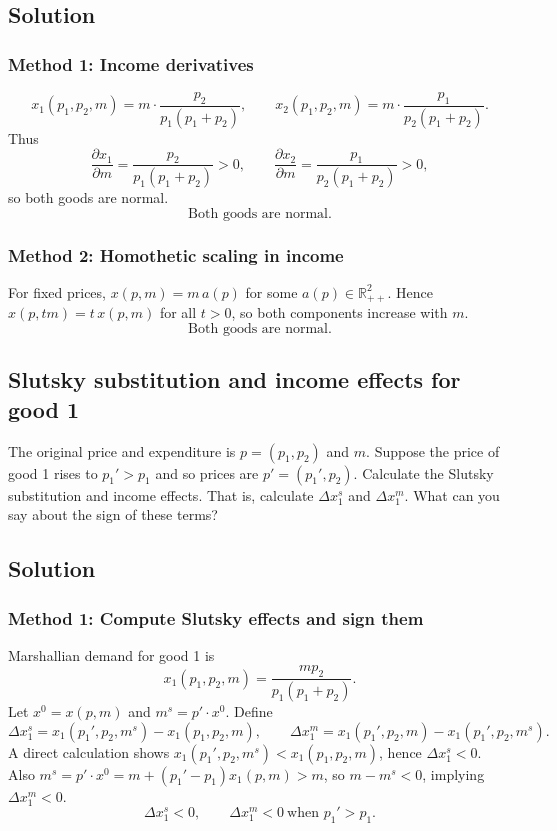 \documentclass[12pt]{article}
\newcommand{\R}{\mathbb{R}}
\newcommand{\dotp}{\cdot}
\begin{document}
\subsection*{Solution}
\subsubsection*{Method 1: Income derivatives}
\[
x_1(p_1,p_2,m)=m\cdot\frac{p_2}{p_1(p_1+p_2)},\qquad
x_2(p_1,p_2,m)=m\cdot\frac{p_1}{p_2(p_1+p_2)}.
\]
Thus
\[
\frac{\partial x_1}{\partial m}=\frac{p_2}{p_1(p_1+p_2)}>0,\qquad
\frac{\partial x_2}{\partial m}=\frac{p_1}{p_2(p_1+p_2)}>0,
\]
so both goods are normal.
\[
\boxed{\text{Both goods are normal.}}
\]

\subsubsection*{Method 2: Homothetic scaling in income}
For fixed prices, \(x(p,m)=m\,a(p)\) for some \(a(p)\in\R^2_{++}\). Hence \(x(p,tm)=t\,x(p,m)\) for all \(t>0\), so both components increase with \(m\).
\[
\boxed{\text{Both goods are normal.}}
\]

\subsection{Slutsky substitution and income effects for good 1}
The original price and expenditure is \(p=(p_1,p_2)\) and \(m\). Suppose the price of good 1 rises to \(p_1'>p_1\) and so prices are \(p'=(p_1',p_2)\).
Calculate the Slutsky substitution and income effects. That is, calculate \(\Delta x_1^{s}\) and \(\Delta x_1^{m}\).
What can you say about the sign of these terms?

\subsection*{Solution}
\subsubsection*{Method 1: Compute Slutsky effects and sign them}
Marshallian demand for good 1 is
\[
x_1(p_1,p_2,m)=\frac{m p_2}{p_1(p_1+p_2)}.
\]
Let \(x^0=x(p,m)\) and \(m^{s}=p'\dotp x^0\). Define
\[
\Delta x_1^{s}=x_1(p_1',p_2,m^{s})-x_1(p_1,p_2,m),\qquad
\Delta x_1^{m}=x_1(p_1',p_2,m)-x_1(p_1',p_2,m^{s}).
\]
A direct calculation shows \(x_1(p_1',p_2,m^{s})<x_1(p_1,p_2,m)\), hence \(\Delta x_1^{s}<0\).
Also \(m^{s}=p'\dotp x^0=m+(p_1'-p_1)x_1(p,m)>m\), so \(m-m^{s}<0\), implying \(\Delta x_1^{m}<0\).
\[
\boxed{\Delta x_1^{s}<0,\qquad \Delta x_1^{m}<0\ \text{when }p_1'>p_1.}
\]
\end{document}
